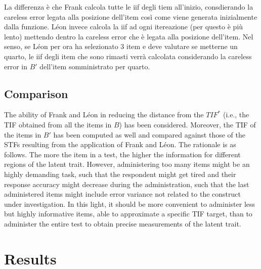 \documentclass{svproc}
\begin{document}
La differenza è che Frank calcola tutte le iif degli tiem all'inizio, consdierando la careless error legata alla posizione dell'item così come viene generata inizialmente dalla funzione. 
Léon invece calcola la iif ad ogni itereazione (per questo è più lento) mettendo dentro la careless error che è legata alla posizione dell'item. Nel senso, se Léon per ora ha selezionato 3 item e deve valutare se metterne un quarto, le iif degli item che sono rimasti verrà calcolata considerando la careless error in $B'$ dell'item somministrato per quarto.
\normalcolor


\subsection{Comparison}

The ability of Frank and Léon in reducing the distance from the $TIF^*$ (i.e., the TIF obtained from all the items in $B$) has been considered. 
Moreover, the TIF of the items in $B'$ has been computed as well and compared against those of the STFs resulting from the application of Frank and Léon. 
The rationale is as follows. The more the item in a test, the higher the information for different regions of the latent trait. 
However, administering too many items might be an highly demanding task, such that the respondent might get tired and their response accuracy might decrease during the administration, such that the last administered items might include error variance not related to the construct under investigation. 
In this light, it should be more convenient to administer less but highly informative items, able to approximate a specific TIF target, than to administer the entire test to obtain precise measurements of the latent trait.
  

\section{Results}

%
\end{document}
